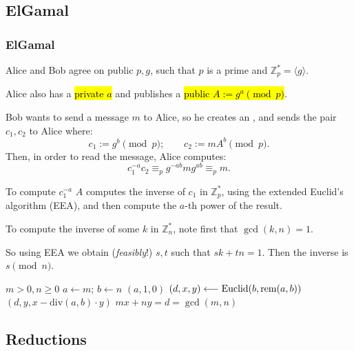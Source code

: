 \subsection{ElGamal}

\begin{frame}
\frametitle{ElGamal}

Alice and Bob agree on public $p,g$, such
that $p$ is a prime and $\mathbb{Z}_p^*=\langle g\rangle$.  

Alice also has a \hl{private $a$} and publishes a \hl{public
$A:=g^a\pmod p$}.

Bob wants
to send a message $m$ to Alice, so he creates an , and sends the pair $c_1,c_2$ to Alice where:
$$
c_1:=g^b\pmod p; \qquad c_2:=mA^b\pmod p.
$$
Then, in order to read the message, Alice computes:
$$
c_1^{-a}c_2\equiv_pg^{-ab}mg^{ab}\equiv_pm.
$$

\end{frame}

\begin{frame}

To compute $c_1^{-a}$ $A$ computes the inverse of
$c_1$ in $\mathbb{Z}_p^*$, using the
extended Euclid's algorithm (EEA), and
then compute the $a$-th power of the result. 

To compute the
inverse of some $k$ in $\mathbb{Z}_n^*$,
note first that
$\gcd(k,n)=1$.  

So using EEA we obtain ({\em feasibly}!)
$s,t$ such that $sk+tn=1$.
Then the inverse is $s\pmod n$.

\begin{algorithmic}[1]
\REQUIRE $m>0, n\ge 0$
\STATE $a\longleftarrow m$;
$b\longleftarrow n$
        \RETURN $(a,1,0)$
\ELSE
        \STATE $(d,x,y)\longleftarrow\text{Euclid}(b,\mathrm{rem}(a,b))$
        \RETURN $(d,y,x-\text{div}(a,b)\cdot y)$
\ENDIF
\ENSURE $mx+ny=d=\gcd(m,n)$
\end{algorithmic}

\end{frame}

\subsection{Reductions}

